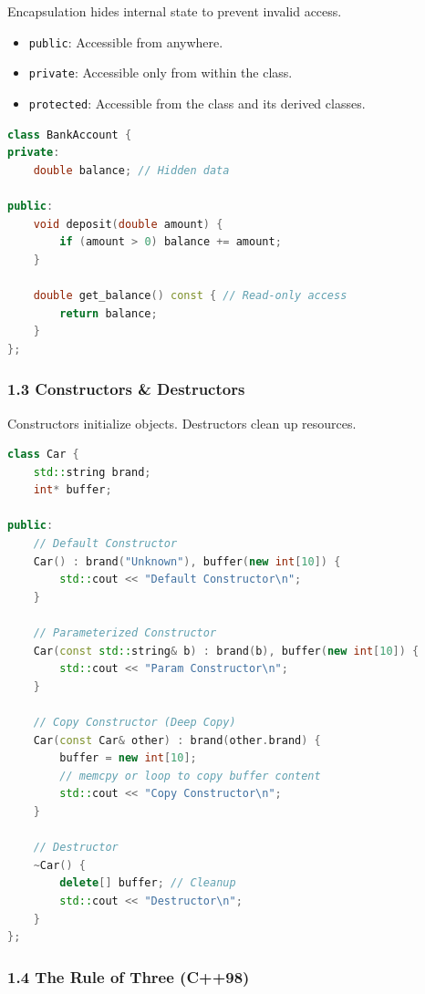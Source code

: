 Encapsulation hides internal state to prevent invalid access.

\begin{itemize}
\tightlist
\item
  \passthrough{\lstinline!public!}: Accessible from anywhere.
\item
  \passthrough{\lstinline!private!}: Accessible only from within the
  class.
\item
  \passthrough{\lstinline!protected!}: Accessible from the class and its
  derived classes.
\end{itemize}

\begin{lstlisting}[language={C++}]
class BankAccount {
private:
    double balance; // Hidden data

public:
    void deposit(double amount) {
        if (amount > 0) balance += amount;
    }

    double get_balance() const { // Read-only access
        return balance;
    }
};
\end{lstlisting}

\hypertarget{constructors-destructors}{%
\subsubsection{1.3 Constructors \&
Destructors}\label{constructors-destructors}}

Constructors initialize objects. Destructors clean up resources.

\begin{lstlisting}[language={C++}]
class Car {
    std::string brand;
    int* buffer;

public:
    // Default Constructor
    Car() : brand("Unknown"), buffer(new int[10]) {
        std::cout << "Default Constructor\n";
    }

    // Parameterized Constructor
    Car(const std::string& b) : brand(b), buffer(new int[10]) {
        std::cout << "Param Constructor\n";
    }

    // Copy Constructor (Deep Copy)
    Car(const Car& other) : brand(other.brand) {
        buffer = new int[10];
        // memcpy or loop to copy buffer content
        std::cout << "Copy Constructor\n";
    }

    // Destructor
    ~Car() {
        delete[] buffer; // Cleanup
        std::cout << "Destructor\n";
    }
};
\end{lstlisting}

\hypertarget{the-rule-of-three-c98}{%
\subsubsection{1.4 The Rule of Three
(C++98)}\label{the-rule-of-three-c98}}

